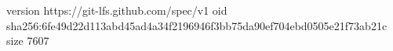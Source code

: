 version https://git-lfs.github.com/spec/v1
oid sha256:6fe49d22d113abd45ad4a34f2196946f3bb75da90ef704ebd0505e21f73ab21c
size 7607
